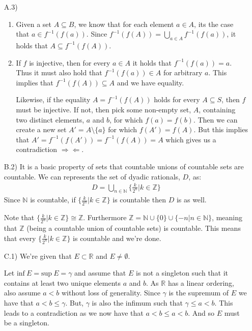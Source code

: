 \documentclass[11pt,letter]{article}
\begin{document}
\begin{enumerate}
    \item[A.3)] 
    \begin{enumerate}
        \item Given a set $A \subseteq B$, we know that for each element $a \in A$, its the case that $a \in f^{-1}(f(a))$. Since $f^{-1}(f(A)) = \bigcup\limits_{a \in A} f^{-1}(f(a))$, it holds that $A \subseteq f^{-1}(f(A))$.
        
        \item If $f$ is injective, then for every $a \in A$ it holds that $f^{-1}(f(a)) = a$. Thus it must also hold that $f^{-1}(f(a)) \in A$ for arbitrary $a$. This implies that $f^{-1}(f(A)) \subseteq A$ and we have equality.

        Likewise, if the equality $A = f^{-1}(f(A))$ holds for every $A \subseteq S$, then $f$ must be injective. If not, then pick some non-empty set, $A$, containing two distinct elements, $a$ and $b$, for which $f(a)  = f(b)$. Then we can create a new set $A' = A \setminus \{ a \}$ for which $f(A') = f(A)$. But this implies that $A' = f^{-1}(f(A')) = f^{-1}(f(A)) = A$ which gives us a contradiction $\Rightarrow\!\Leftarrow$.
    \end{enumerate}

    \item[B.2)] It is a basic property of sets that countable unions of countable sets are countable. We can represents the set of dyadic rationals, $D$, as:
    \begin{align*}
        D = \bigcup\limits_{n \in \mathbb N} \{\frac{k}{2^n}|k\in\mathbb Z\}
    \end{align*}
    Since $\mathbb N$ is countable, if $\{\frac{k}{2^n}|k \in \mathbb Z\}$ is countable then $D$ is as well. 
    
    Note that $\{\frac{k}{2^n}|k \in \mathbb Z\} \cong \mathbb Z$. Furthermore $\mathbb{Z} = \mathbb{N} \cup \{0\} \cup \{-n|n \in \mathbb{N}\}$, meaning that $\mathbb{Z}$ (being a countable union of countable sets) is countable. This means that every $\{\frac{k}{2^n}|k \in \mathbb Z\}$ is countable and we're done.

    \item[C.1)] We're given that $E \subset \mathbb{R}$ and $E \ne \emptyset$.

    Let $\text{inf}\ E = \text{sup}\ E = \gamma$ and assume that $E$ is not a singleton such that it contains at least two unique elements $a$ and $b$. As $\mathbb{R}$ has a linear ordering, also assume $a < b$ without loss of generality. Since $\gamma$ is the supremum of $E$ we have that $ a < b \le \gamma$. But, $\gamma$ is also the infimum such that $\gamma \le a < b$. This leads to a contradiction as we now have that $a < b \le a < b$. And so $E$ must be a singleton.


\end{enumerate}
\end{document}
